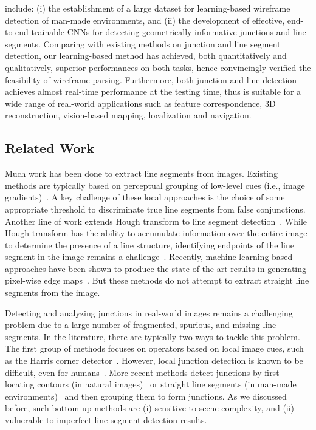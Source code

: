 \documentclass[10pt,twocolumn,letterpaper]{article}
\begin{document}
 include: (i) the establishment of a large dataset for learning-based wireframe detection of man-made environments, and (ii) the development of effective, end-to-end trainable CNNs for detecting geometrically informative junctions and line segments. Comparing with existing methods on junction and line segment detection, our learning-based method has achieved, both quantitatively and qualitatively, superior performances on both tasks, hence convincingly verified the feasibility of wireframe parsing. Furthermore, both junction and line detection achieves almost real-time performance at the testing time, thus is suitable for a wide range of real-world applications such as feature correspondence, 3D reconstruction, vision-based mapping, localization and navigation.
 \subsection*{Related Work}
\vspace{-2mm}
 Much work has been done to extract line segments from images. Existing methods are typically based on perceptual grouping of low-level cues (i.e., image gradients)~\cite{NietoCSG11, von2012lsd, BrownWG15, LiuCGNZT15, LuYLL15}. A key challenge of these local approaches is the choice of some appropriate threshold to discriminate true line segments from false conjunctions. Another line of work extends Hough transform to line segment detection~\cite{MatasGK00, FurukawaS03, XuSK15}. While Hough transform has the ability to accumulate information over the entire image to determine the presence of a line structure, identifying endpoints of the line segment in the image remains a challenge~\cite{Almazan17}. Recently, machine learning based approaches have been shown to produce the state-of-the-art results in generating pixel-wise edge maps~\cite{DollarZ13, XieT15, ManinisPAG16}. But these methods do not attempt to extract straight line segments from the image.

Detecting and analyzing junctions in real-world images remains a challenging problem due to a large number of fragmented, spurious, and missing line segments. In the literature, there are typically two ways to tackle this problem. The first group of methods focuses on operators based on local image cues, such as the Harris corner detector~\cite{HarrisS88}. However, local junction detection is known to be difficult, even for humans~\cite{McDermott04}. More recent methods detect junctions by first locating contours (in natural images)~\cite{MaireAFM08} or straight line segments (in man-made environments)~\cite{LeeHK09, RamalingamPJT13, ElqurshE11, XiaDG14} and then grouping them to form junctions. As we discussed before, such bottom-up methods are (i) sensitive to scene complexity, and (ii) vulnerable to imperfect line segment detection results.
\end{document}
